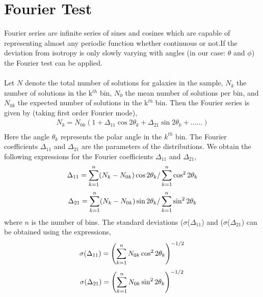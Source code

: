 \section{Fourier Test}\label{fourier}
Fourier series are infinite series of sines and cosines which are
capable of representing almost any periodic function whether
continuous or not.If the deviation from isotropy is only slowly
varying with angles (in our case: $\theta$ and $\phi$) the Fourier
test can be applied.
\\
\\
Let $N$ denote the total number of solutions for galaxies in the
sample, $N_{k}$ the number of solutions in the k$^{th}$ bin,
$N_{0}$ the mean number of solutions per bin, and $N_{0k}$ the
expected number of solutions in the k$^{th}$ bin. Then the Fourier
series is given by (taking first order Fourier mode),
\begin{equation}
\begin{array}{l}
N_{k} = N_{0k}(1+ \Delta_{11} \cos 2\theta_{k}+ \Delta_{21} \sin 2\theta_{k}+ ......)\\
\end{array}
\end{equation}
Here the angle $\theta_{k}$ represents the polar angle in the
$k^{th}$ bin. The Fourier coefficients  $\Delta_{11}$ and
$\Delta_{21}$ are the parameters of the distributions. We obtain
the following expressions for the Fourier coefficients
$\Delta_{11}$ and $\Delta_{21}$,
\begin{equation}
\Delta_{11} = \sum_{k=1}^n (N_{k}-N_{0k}) \cos 2\theta_{k} / \sum_{k=1}^n \cos^2 2\theta_{k} \\
\end{equation}
\begin{equation}
\Delta_{21} = \sum_{k=1}^n (N_{k}-N_{0k}) \sin 2\theta_{k} / \sum_{k=1}^n \sin^2 2\theta_{k} \\
\end{equation}
where $n$ is the number of bins.
The standard deviations  ($\sigma$($\Delta_{11}$) and
($\sigma$($\Delta_{21}$) can be obtained using the expressions,
\begin{equation}
\sigma (\Delta_{11}) = \left(\sum_{k=1}^n N_{0k} \cos^2 2\theta_{k}\right)^{-1/2} \\
\end{equation}
\begin{equation}
\sigma (\Delta_{21}) =\left(\sum_{k=1}^n N_{0k} \sin^2 2\theta_{k}\right)^{-1/2} \\
\end{equation}
